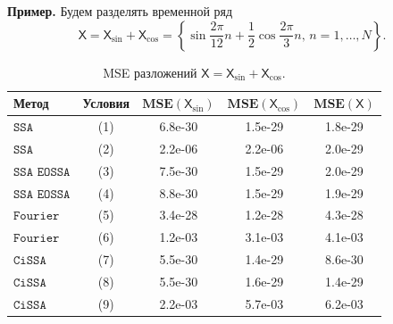 \documentclass[12pt, specialist, subf
]{disser}
\theoremstyle{definition}
\newcommand{\SSA}{\texttt{SSA}}
\newcommand{\EOSSA}{\texttt{SSA EOSSA}}
\newcommand{\CISSA}{\texttt{CiSSA}}
\newcommand{\FOURIER}{\texttt{Fourier}}
\newcommand{\TS}{\mathsf{X}}
\newcommand{\MSE}{\textbf{MSE}}
\begin{document}


\textbf{\large{Пример.}} Будем разделять временной ряд 
\[ \TS = \TS_{\sin} + \TS_{\cos} = 
\left\{ 
	\sin{\frac{2\pi}{12}n} + \frac{1}{2}\cos{\frac{2\pi}{3}n}, \, n = 1, \dots, N \right\}.\]

\begin{table}[H]
\centering
\caption{MSE разложений \(\TS = \TS_{\sin} + \TS_{\cos}\).}
\label{tab:exact_not_noised_results}
\begin{tabular}{l|c|ccc}
  \hline
  \textbf{Метод} & \textbf{Условия} & \(\MSE(\TS_{\sin})\) & \(\MSE(\TS_{\cos})\) & \(\MSE(\TS)\) \\ 
  \hline
  $\SSA$    & (1) & 6.8e-30 & 1.5e-29 & 1.8e-29 \\ 
  $\SSA$    & (2) & 2.2e-06 & 2.2e-06 & 2.0e-29 \\ 
  \hline
  $\EOSSA$  & (3) & 7.5e-30 & 1.5e-29 & 2.0e-29 \\ 
  $\EOSSA$  & (4) & 8.8e-30 & 1.5e-29 & 1.9e-29 \\ 
  \hline
  $\FOURIER$    & (5) & 3.4e-28 & 1.2e-28 & 4.3e-28 \\ 
  $\FOURIER$ & (6) & 1.2e-03 & 3.1e-03 & 4.1e-03 \\ 
  \hline
  $\CISSA$  & (7) & 5.5e-30 & 1.4e-29 & 8.6e-30 \\ 
  $\CISSA$ & (8) & 5.5e-30 & 1.6e-29 & 1.4e-29 \\ 
  $\CISSA$ & (9) & 2.2e-03 & 5.7e-03 & 6.2e-03 \\ 
  \hline
\end{tabular}
\end{table}
\end{document}
